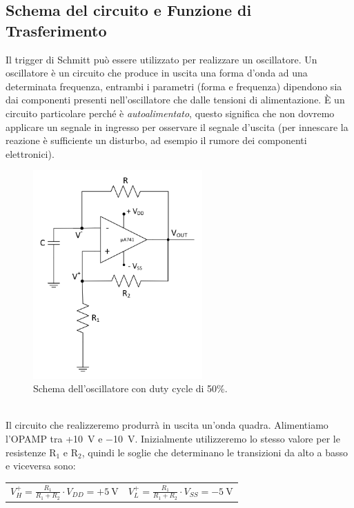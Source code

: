 \documentclass{report}
\begin{document}
\subsection{Schema del circuito e Funzione di Trasferimento}
Il trigger di Schmitt può essere utilizzato per realizzare un oscillatore. Un oscillatore è un circuito  che produce in uscita una forma d'onda ad una determinata frequenza, entrambi i parametri (forma e frequenza) dipendono sia dai componenti presenti nell'oscillatore che dalle tensioni di alimentazione. \`E un circuito particolare perché è \textit{autoalimentato}, questo significa che non dovremo applicare un segnale in ingresso per osservare il segnale d'uscita (per innescare la reazione è sufficiente un disturbo, ad esempio il rumore dei componenti elettronici).
\begin{figure}[h!]
	\centering
	\includegraphics[height=8cm]{immagini/schema3}
	\caption{Schema dell'oscillatore con duty cycle di 50\%.}
	\label{figura:schema3}
\end{figure}
\\Il circuito che realizzeremo produrrà in uscita un'onda quadra. Alimentiamo l'OPAMP tra +\SI{10}{\volt} e \SI{-10}{\volt}. Inizialmente utilizzeremo lo stesso valore per le resistenze $\mathrm{R_1}$ e $\mathrm{R_2}$, quindi le soglie che determinano le transizioni da alto a basso e viceversa sono:
\begin{table}[h!]
	\centering
	\begin{tabular}{cc}
		$\displaystyle{V_H^+=\frac{R_1}{R_1+R_2}\cdot V_{DD}=+\SI{5}{\volt}}$\;\;\;\;\;\;\;\;\;\;\;\;\;\;\;\;\;\;\;\; & $\displaystyle{V_L^+=\frac{R_1}{R_1+R_2}\cdot V_{SS}=-\SI{5}{\volt}}$\\ 
	\end{tabular}
\end{table}
\end{document}
